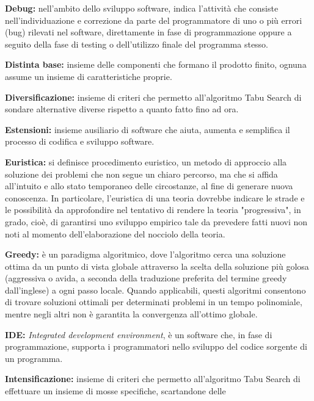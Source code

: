 \begin{description}
    \item \label{Debug} \textbf{Debug:} nell'ambito dello sviluppo software, indica l'attività che consiste nell'individuazione e correzione da parte del programmatore di uno o più errori (bug) rilevati nel software, direttamente in fase di programmazione oppure a seguito della fase di testing o dell'utilizzo finale del programma stesso.
    \item \label{Distinta base} \textbf{Distinta base:} insieme delle componenti che formano il prodotto finito, ognuna assume un insieme di caratteristiche proprie.
    \item \label{Diversificazione} \textbf{Diversificazione:} insieme di criteri che permetto all'algoritmo Tabu Search di sondare alternative diverse rispetto a quanto fatto fino ad ora.
    \item \label{Estensioni} \textbf{Estensioni:} insieme ausiliario di software che aiuta, aumenta e semplifica il processo di codifica e sviluppo software.
    \item \label{Euristica} \textbf{Euristica:} si definisce procedimento euristico, un metodo di approccio alla soluzione dei problemi che non segue un chiaro percorso,
     ma che si affida all'intuito e allo stato temporaneo delle circostanze, al fine di generare nuova conoscenza. In particolare, l'euristica di una teoria dovrebbe indicare
    le strade e le possibilità da approfondire nel tentativo di rendere la teoria "progressiva", in grado, cioè, di garantirsi uno sviluppo empirico tale da prevedere fatti
    nuovi non noti al momento dell'elaborazione del nocciolo della teoria.
    \item \label{Greedy} \textbf{Greedy:} è un paradigma algoritmico, dove l'algoritmo cerca una soluzione ottima da un punto di vista globale attraverso la
     scelta della soluzione più golosa (aggressiva o avida, a seconda della traduzione preferita del termine greedy dall'inglese) a ogni passo locale. 
     Quando applicabili, questi algoritmi consentono di trovare soluzioni ottimali per determinati problemi in un tempo polinomiale, mentre negli altri non 
     è garantita la convergenza all'ottimo globale.
    \item \label{IDE} \textbf{IDE:} \textit{Integrated development environment}, è un software che, in fase di programmazione, supporta i programmatori nello sviluppo del codice sorgente di un programma.
    \item \label{Intensificazione} \textbf{Intensificazione:} insieme di criteri che permetto all'algoritmo Tabu Search di effettuare un insieme di mosse specifiche, scartandone delle

\end{description}
